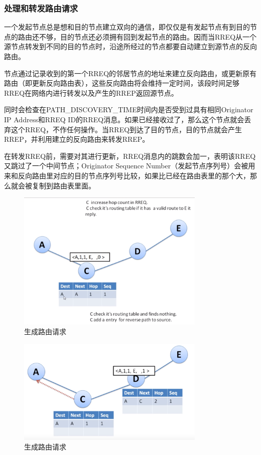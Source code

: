 \documentclass[12pt,a4paper]{article}
\begin{document}
\subsubsection{处理和转发路由请求}
一个发起节点总是想和目的节点建立双向的通信，即仅仅是有发起节点有到目的节点的路由还不够，目的节点还必须拥有回到发起节点的路由。因而当RREQ从一个源节点转发到不同的目的节点时，沿途所经过的节点都要自动建立到源节点的反向路由。

节点通过记录收到的第一个RREQ的邻居节点的地址来建立反向路由，或更新原有路由（即更新反向路由表），这些反向路由将会维持一定时间，该段时间足够RREQ在网络内进行转发以及产生的RREP返回源节点。

同时会检查在PATH\_DISCOVERY\_TIME时间内是否受到过具有相同Originator IP Address和RREQ ID的RREQ消息。如果已经接收过了，那么这个节点就会丢弃这个RREQ，不作任何操作。当RREQ到达了目的节点，目的节点就会产生RREP，并利用建立的反向路由来转发RREP。

在转发RREQ前，需要对其进行更新，RREQ消息内的跳数会加一，表明该RREQ又跳过了一个中间节点；Originator Sequence Number（发起节点序列号）会被用来和反向路由里对应的目的节点序列号比较，如果比已经在路由表里的那个大，那么就会被复制到路由表里面。

\begin{figure}[htb]
\centering
\includegraphics[width=9cm]{handle_route_request_1}
\caption{生成路由请求}
\end{figure}

\begin{figure}[htb]
\centering
\includegraphics[width=9cm]{handle_route_request_2}
\caption{生成路由请求}
\end{figure}
\end{document}
